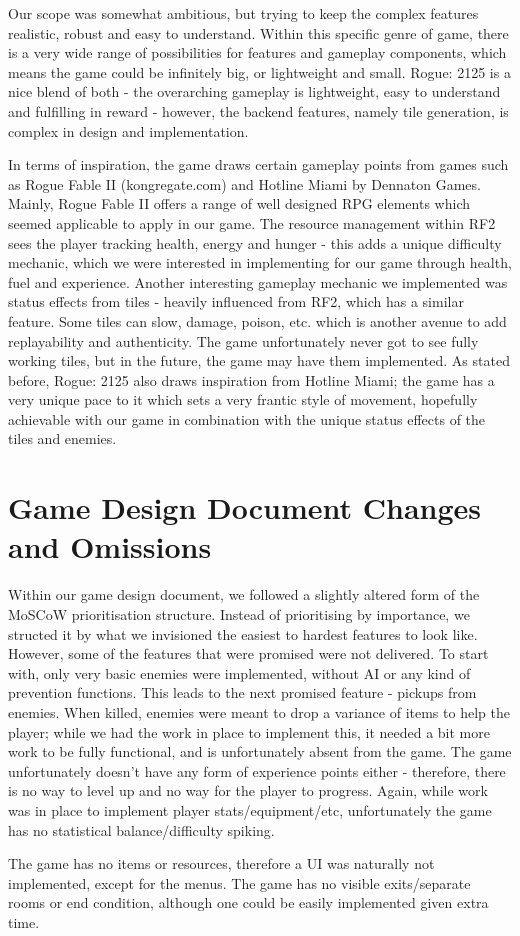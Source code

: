 \documentclass[12pt]{article}
\begin{document}
Our scope was somewhat ambitious, but trying to keep the complex features realistic, robust and easy to understand. Within this specific genre of game, there is a very wide range of possibilities for features and gameplay components, which means the game could be infinitely big, or lightweight and small. Rogue: 2125 is a nice blend of both - the overarching gameplay is lightweight, easy to understand and fulfilling in reward - however, the backend features, namely tile generation, is complex in design and implementation. \linebreak

In terms of inspiration, the game draws certain gameplay points from games such as Rogue Fable II (kongregate.com) and Hotline Miami by Dennaton Games. Mainly, Rogue Fable II offers a range of well designed RPG elements which seemed applicable to apply in our game. The resource management within RF2 sees the player tracking health, energy and hunger - this adds a unique difficulty mechanic, which we were interested in implementing for our game through health, fuel and experience. Another interesting gameplay mechanic we implemented was status effects from tiles - heavily influenced from RF2, which has a similar feature. Some tiles can slow, damage, poison, etc. which is another avenue to add replayability and authenticity. The game unfortunately never got to see fully working tiles, but in the future, the game may have them implemented. As stated before, Rogue: 2125 also draws inspiration from Hotline Miami; the game has a very unique pace to it which sets a very frantic style of movement, hopefully achievable with our game in combination with the unique status effects of the tiles and enemies.

\vfill

\section{Game Design Document Changes and Omissions}

Within our game design document, we followed a slightly altered form of the MoSCoW prioritisation structure. Instead of prioritising by importance, we structed it by what we invisioned the easiest to hardest features to look like. However, some of the features that were promised were not delivered. To start with, only very basic enemies were implemented, without AI or any kind of prevention functions. This leads to the next promised feature - pickups from enemies. When killed, enemies were meant to drop a variance of items to help the player; while we had the work in place to implement this, it needed a bit more work to be fully functional, and is unfortunately absent from the game. The game unfortunately doesn't have any form of experience points either - therefore, there is no way to level up and no way for the player to progress. Again, while work was in place to implement player stats/equipment/etc, unfortunately the game has no statistical balance/difficulty spiking. \linebreak

The game has no items or resources, therefore a UI was naturally not implemented, except for the menus. The game has no visible exits/separate rooms or end condition, although one could be easily implemented given extra time.
\end{document}
